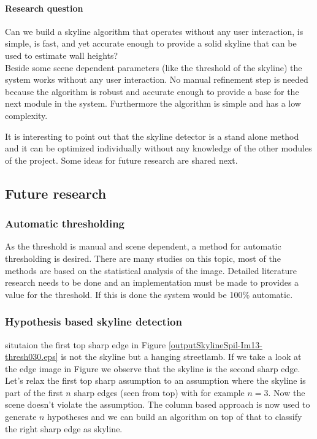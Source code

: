 \paragraph{Research question}
Can we build a skyline algorithm that operates without any user interaction, is
simple, is fast, and yet accurate enough to provide a solid skyline that can be
used to estimate wall heights?\\

Beside some scene dependent parameters (like the threshold of the skyline) the
system works without any user interaction. No manual refinement step is needed
because the algorithm is robust and accurate enough to provide a base for the
next module in the system. Furthermore the algorithm is simple and has a low
complexity. 

It is interesting to point out that the skyline detector is a stand alone method
and it can be optimized individually without any knowledge of the other modules
of the project.  Some ideas for future research are shared next.

\subsection{Future research}
\label{sec:skylinefut}
\subsubsection{Automatic thresholding}
As the threshold is manual and scene dependent, a method for automatic
thresholding is desired. There are many studies on this topic, most of the
methods are based on the statistical analysis of the image. Detailed literature
research needs to be done and an implementation must be made to provides a value
for the threshold. If this is done the system would be 100\% automatic.

\subsubsection{Hypothesis based skyline detection}
situtaion 
the first top sharp edge 
in Figure \ref{outputSkylineSpil-Im13-thresh030.eps}
is not the skyline but a hanging streetlamb.
If we take a look at the edge image in Figure
we observe that the skyline is the second
sharp edge.
Let's relax the first top sharp assumption to an assumption where the skyline is
part of the first $n$ sharp edges (seen from top) with for example $n=3$.
Now the scene doesn't violate the assumption.
The column based approach is now used to generate $n$ hypotheses and we can build
an algorithm on top of that to classify the right sharp edge as skyline.

